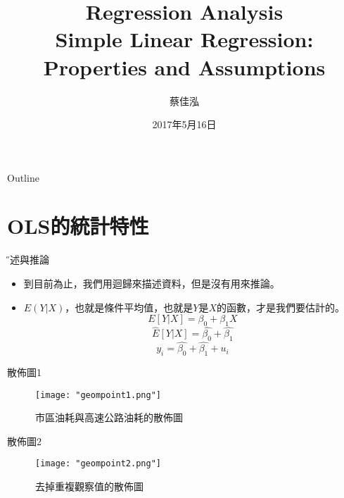 \documentclass[xcolor=dvipsnames]{beamer}
\author[蔡佳泓]{\K 蔡佳泓}
\title[Statistical Methods for Social Sciences]{Regression Analysis\\
\smallskip
{\small {Simple Linear Regression: Properties and Assumptions}}}
\date[5/16/2017]{2017年5月16日} %
\institute[ESC \& GIEAS]{\H 國立政治大學選舉研究中心暨東亞研究所}
\begin{document}
\maketitle
\begin{frame}{Outline}
\tableofcontents
\end{frame}

\section{OLS的統計特性}
\begin{frame}{\H 描述與推論}

\begin{itemize}
\item 到目前為止，我們用迴歸來描述資料，但是沒有用來推論。
\item $ E(Y|X) $，也就是條件平均值，也就是$Y$是$X$的函數，才是我們要估計的。
\[E[Y|X]=\beta_{0}+\beta_{1}X\]
\[\hat{E}[Y|X]=\hat{\beta_{0}}+\hat{\beta_{1}}\]
\[y_{i}=\hat{\beta_{0}}+\hat{\beta_{1}}+u_{i}\]
\end{itemize}
\end{frame}
\begin{frame}{散佈圖1}
\begin{figure}
\texttt{[image: "geompoint1.png"]}
\caption{市區油耗與高速公路油耗的散佈圖}
\label{fig.1}
\end{figure}
\end{frame}
\begin{frame}{散佈圖2}
\begin{figure}
\texttt{[image: "geompoint2.png"]}
\caption{去掉重複觀察值的散佈圖}
\label{fig.2}
\end{figure}
\end{frame}
\end{document}
